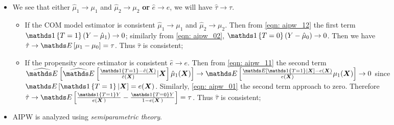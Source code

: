 \documentclass[11pt]{article}
\begin{document}
\begin{itemize}
\item We see that either $\hat{\mu}_1 \rightarrow \mu_1$ and $\hat{\mu}_2 \rightarrow \mu_2$ \textbf{or} $\hat{e} \rightarrow e$, we will have $\hat{\tau} \rightarrow \tau$.
\begin{itemize}
\item If the COM model estimator is consistent $\hat{\mu}_1 \rightarrow \mu_1$ and $\hat{\mu}_2 \rightarrow \mu_2$. Then from \eqref{eqn: aipw_12} the first term $\ind{T=1}(Y- \hat{\mu}_1) \rightarrow 0$; similarly from \eqref{eqn: aipw_02},  $\ind{T=0}(Y- \hat{\mu}_0) \rightarrow 0$. Then we have $\hat{\tau} \rightarrow \E{}{\mu_1 - \mu_0} =  \tau$. Thus $\hat{\tau}$ is consistent;

\item If the propensity score estimator is consistent $\hat{e} \rightarrow e$. Then from \eqref{eqn: aipw_11} the second term $\Em{}{\Em{}{\frac{\ind{T=1} - \hat{e}(\mb{X})}{\hat{e}(\mb{X})}|\mb{X}}\hat{\mu}_1(\mb{X})} \rightarrow \E{}{\frac{\E{}{\ind{T=1}|\mb{X}} - e(\mb{X})}{e(\mb{X})}\mu_1(\mb{X})} \rightarrow 0$ since $\E{}{\ind{T=1}|\mb{X}} = e(\mb{X})$. Similarly, \eqref{eqn: aipw_01} the second term approach to zero. Therefore $\hat{\tau} \rightarrow \E{}{\frac{\ind{T=1}Y}{e(\mb{X}\,)} - \frac{\ind{T=0}Y}{1- e(\mb{X}\,)} } =  \tau$. Thus $\hat{\tau}$ is consistent;
\end{itemize}

\item AIPW is analyzed using \emph{semiparametric theory}.
\end{itemize}
\newpage


\end{document}
